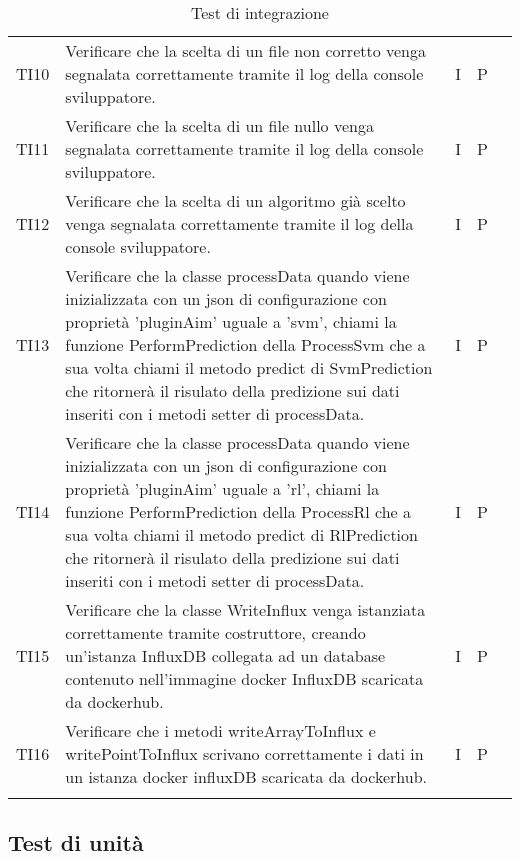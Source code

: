 \begin{longtable} {
		>{}p{15mm} 
		>{}p{79.5mm}
		>{}p{15mm} 
		>{}p{15mm}
		>{}p{0mm}}
	TI10      &  Verificare che la scelta di un file non corretto venga segnalata correttamente tramite il log della console sviluppatore.& I & P  &\TBstrut \\ [2mm]
	TI11      &  Verificare che la scelta di un file nullo venga segnalata correttamente tramite il log della console sviluppatore.& I & P  &\TBstrut \\ [2mm]
	TI12      &  Verificare che la scelta di un algoritmo già scelto venga segnalata correttamente tramite il log della console sviluppatore.& I & P  &\TBstrut \\ [2mm]

	TI13		& Verificare che la classe processData quando viene inizializzata con un json di configurazione con proprietà 'pluginAim' uguale a 'svm', chiami la funzione PerformPrediction della ProcessSvm che a sua volta chiami il metodo predict di SvmPrediction che ritornerà il risulato della predizione sui dati inseriti con i metodi setter di processData.& I & P &\TBstrut \\ [2mm]
	TI14		& Verificare che la classe processData quando viene inizializzata con un json di configurazione con proprietà 'pluginAim' uguale a 'rl', chiami la funzione PerformPrediction della ProcessRl che a sua volta chiami il metodo predict di RlPrediction che ritornerà il risulato della predizione sui dati inseriti con i metodi setter di processData.& I & P &\TBstrut \\ [2mm]
	TI15		& Verificare che la classe WriteInflux venga istanziata correttamente tramite costruttore, creando un'istanza InfluxDB collegata ad un database contenuto nell'immagine docker InfluxDB scaricata da dockerhub.& I & P &\TBstrut \\ [2mm]
	TI16	& Verificare che i metodi writeArrayToInflux e writePointToInflux scrivano correttamente i dati in un istanza docker influxDB scaricata da dockerhub.& I & P &\TBstrut \\ [2mm]
	
	\rowcolor{white}
	\caption{Test di integrazione}
\end{longtable}



\subsection{Test di unità}

